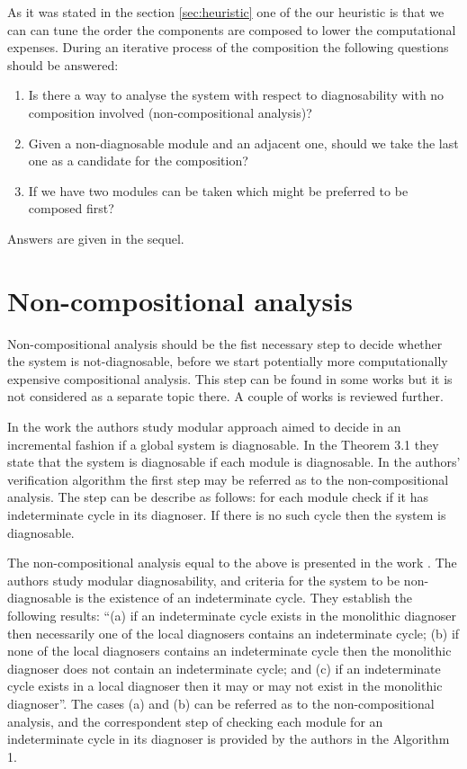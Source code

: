 \documentclass[a4paper, 10pt, conference]{ieeeconf} \IEEEoverridecommandlockouts
\begin{document}
As it was stated in the section \ref{sec:heuristic} one of the our heuristic is
that we can can tune the order the components are composed to lower the
computational expenses. During an iterative process of the composition the
following questions should be answered:
\begin{enumerate}
  \item Is there a way to analyse the system with respect to diagnosability with
  no composition involved (non-compositional analysis)?
  \item Given a non-diagnosable module and an adjacent one, should we take
  the last one as a candidate for the composition?
  \item If we have two modules can be taken which might be preferred to be
  composed first?
\end{enumerate}

Answers are given in the sequel.

\section{Non-compositional analysis}
\label{sec:Proposal}
Non-compositional analysis should be the fist necessary step
to decide whether the system is not-diagnosable, before we start potentially more
computationally expensive compositional analysis. This step can be found in
some works but it is not considered as a separate topic there. A couple of works
is reviewed further.

In the work \cite{debouk_modular_2002} the authors study modular approach
aimed to decide in an incremental fashion if a global system is diagnosable. In
the Theorem 3.1 they state that the system is diagnosable if each module is
diagnosable. In the authors' verification algorithm the first step may be
referred as to the non-compositional analysis. The step can be describe as
follows: for each module check if it has indeterminate cycle in its diagnoser.
If there is no such cycle then the system is diagnosable. 

The non-compositional analysis equal to the above is presented in the work
\cite{contant_diagnosability_2006}. The authors study modular diagnosability,
and criteria for the system to be non-diagnosable is the existence of
an indeterminate cycle. They establish the following results: 
``(a) if an indeterminate cycle exists in the monolithic diagnoser then
necessarily one of the local diagnosers contains an indeterminate cycle; 
(b) if none of the local diagnosers contains an indeterminate cycle then the
monolithic diagnoser does not contain an indeterminate cycle; and 
(c) if an indeterminate cycle exists in a local diagnoser then it may or may not
exist in the monolithic diagnoser''.
The cases (a) and (b) can be referred as to the non-compositional analysis, and
the correspondent step of checking each module for an indeterminate
cycle in its diagnoser is provided by the authors in the Algorithm 1.
\end{document}

